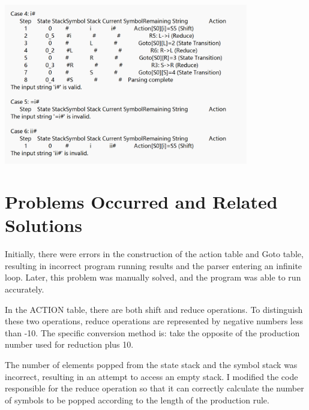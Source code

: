 \documentclass[a4paper,12pt]{article}
\begin{document}
\centerline{\includegraphics[width=0.8\textwidth]{photo/3.png}}
\vspace{10pt}

\section{Problems Occurred and Related Solutions}
Initially, there were errors in the construction of the action table and Goto table, resulting in incorrect program running results and the parser entering an infinite loop. Later, this problem was manually solved, and the program was able to run accurately.

In the ACTION table, there are both shift and reduce operations. To distinguish these two operations, reduce operations are represented by negative numbers less than -10. The specific conversion method is: take the opposite of the production number used for reduction plus 10.

The number of elements popped from the state stack and the symbol stack was incorrect, resulting in an attempt to access an empty stack. I modified the code responsible for the reduce operation so that it can correctly calculate the number of symbols to be popped according to the length of the production rule.
\end{document}
